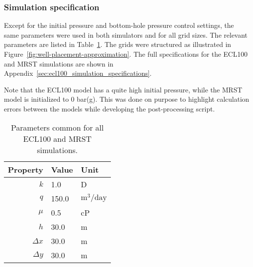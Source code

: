 \subsubsection{Simulation specification} %
\label{ssub:simulation_specification}
Except for the initial pressure and bottom-hole pressure control settings, the same parameters were used in both simulators and for all grid sizes. The relevant parameters are listed in Table~\ref{tbl:simulation-parameters}. The grids were structured as illustrated in Figure~\ref{fig:well-placement-approximation}. The full specifications for the ECL100 and MRST simulations are shown in Appendix~\ref{sec:ecl100_simulation_specifications}.

Note that the ECL100 model has a quite high initial pressure, while the MRST model is initialized to 0 bar(g). This was done on purpose to highlight calculation errors between the models while developing the post-processing script.

\begin{table}[H]
    \caption{Parameters common for all ECL100 and MRST simulations.}
    \centering
    \begin{tabular}{rll}
        \toprule
        Property & Value & Unit \\
        \midrule
        $k$        & 1.0   & D                           \\
        $q$        & 150.0 & $\mathrm{m}^3/\mathrm{day}$ \\
        $\mu$      & 0.5   & cP                          \\
        $h$        & 30.0  & m                           \\
        $\Delta x$ & 30.0  & m                           \\
        $\Delta y$ & 30.0  & m                           \\
        \bottomrule
    \end{tabular}
    \label{tbl:simulation-parameters}
\end{table}


